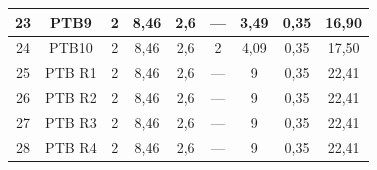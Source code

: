 \documentclass[	DIV=calc,%
							paper=a4,%
							fontsize=12pt,%
							onecolumn]{scrartcl}	 					%
\begin{document}
\begin{tabular}{|c|c|c|c|c|c|c|c|c|}
	23                 & PTB9               & 2                                                    & 8,46                                        & 2,6                                           & ---                                           & 3,49                                             & 0,35                                            & 16,90                                                             \\ \hline
	24                 & PTB10              & 2                                                    & 8,46                                        & 2,6                                           & 2                                             & 4,09                                             & 0,35                                            & 17,50                                                             \\ \hline
	25                 & PTB R1             & 2                                                    & 8,46                                        & 2,6                                           & ---                                           & 9                                                & 0,35                                            & 22,41                                                             \\ \hline
	26                 & PTB R2             & 2                                                    & 8,46                                        & 2,6                                           & ---                                           & 9                                                & 0,35                                            & 22,41                                                             \\ \hline
	27                 & PTB R3             & 2                                                    & 8,46                                        & 2,6                                           & ---                                           & 9                                                & 0,35                                            & 22,41                                                             \\ \hline
	28                 & PTB R4             & 2                                                    & 8,46                                        & 2,6                                           & ---                                           & 9                                                & 0,35                                            & 22,41                                                             \\ \hline

\end{tabular}
\end{document}
